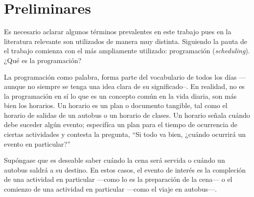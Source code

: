 \documentclass[draft,12pt,headsepline,footsepline,paper=letter]{scrreprt}
\begin{document}

\section{Preliminares}
\label{sec:preliminares}

Es necesario aclarar algunos términos prevalentes en este trabajo pues en la literatura relevante son utilizados de manera muy distinta. Siguiendo la pauta de \citet[p.~46]{wren95scheduling-timetabling} el trabajo comienza con el más ampliamente utilizado: programación (\textit{scheduling}). ¿Qué es la programación?

La programación como palabra, forma parte del vocabulario de todos los días —aunque no siempre se tenga una idea clara de su significado–. En realidad, no es la programación en sí lo que es un concepto común en la vida diaria, son más bien los horarios. Un horario es un plan o documento tangible, tal como el horario de salidas de un autobus o un horario de clases. Un horario señala cuándo debe suceder algún evento; especifíca un plan para el tiempo de ocurrencia de ciertas actividades y contesta la pregunta, “Si todo va bien, ¿cuándo ocurrirá un evento en particular?” 

Supóngase que es deseable saber cuándo la cena será servida o cuándo un autobus saldrá a su destino. En estos casos, el evento de interés es la compleción de una actividad en particular —como lo es la preparación de la cena— o el comienzo de una actividad en particular —como el viaje en autobus—.
\end{document}
